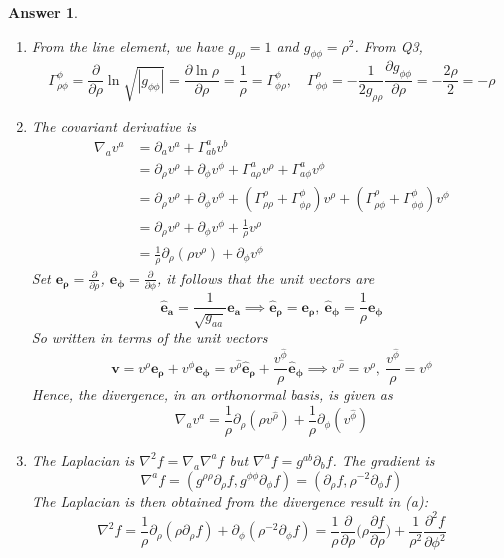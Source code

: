\documentclass[a4paper]{article}
\theoremstyle{new2}
\newtheorem{ans}{Answer}[section]
\theoremstyle{new}
\begin{document}
\begin{ans}\leavevmode
\begin{enumerate}[label=(\alph*)]
\item From the line element, we have $g_{\rho\rho}=1$ and $g_{\phi\phi}=\rho^2$. From Q3, 
$$\Gamma_{\rho\phi}^\phi=\frac{\partial}{\partial\rho}\ln\sqrt{|g_{\phi\phi}|}=\frac{\partial\ln\rho}{\partial\rho}=\frac{1}{\rho}=\Gamma_{\phi\rho}^\phi,\quad\Gamma_{\phi\phi}^\rho=-\frac{1}{2g_{\rho\rho}}\frac{\partial g_{\phi\phi}}{\partial\rho}=-\frac{2\rho}{2}=-\rho$$
\item The covariant derivative is
\begin{align}
    \nabla_av^a&=\partial_av^a+\Gamma_{ab}^av^b\nonumber\\&=\partial_\rho v^\rho+\partial_\phi v^\phi+\Gamma_{a\rho}^av^\rho+\Gamma_{a\phi}^a v^\phi\nonumber\\&=\partial_\rho v^\rho+\partial_\phi v^\phi+(\Gamma_{\rho\rho}^\rho+\Gamma_{\phi\rho}^\phi)v^\rho+(\Gamma_{\rho\phi}^\rho+\Gamma_{\phi\phi}^\phi) v^\phi\nonumber\\&=\partial_\rho v^\rho+\partial_\phi v^\phi+\frac{1}{\rho}v^\rho\nonumber\\&=\frac{1}{\rho}\partial_\rho(\rho v^\rho)+\partial_\phi v^\phi\nonumber
\end{align}
Set $\boldsymbol{e_\rho}=\frac{\partial}{\partial\rho}$, $\boldsymbol{e_\phi}=\frac{\partial}{\partial\phi}$, it follows that the unit vectors are
$$\boldsymbol{\hat{e}_a}=\frac{1}{\sqrt{g_{aa}}}\boldsymbol{e_a}\implies\boldsymbol{\hat{e}_\rho}=\boldsymbol{e_\rho},~\boldsymbol{\hat{e}_\phi}=\frac{1}{\rho}\boldsymbol{e_\phi}$$
So written in terms of the unit vectors
$$\mathbf{v}=v^\rho\boldsymbol{e_\rho}+v^\phi\boldsymbol{e_\phi}=v^{\hat{\rho}}\boldsymbol{\hat{e}_\rho}+\frac{v^{\hat{\phi}}}{\rho}\boldsymbol{\hat{e}_\phi}\implies v^{\hat{\rho}}=v^\rho,~\frac{v^{\hat{\phi}}}{\rho}=v^\phi$$
Hence, the divergence, in an orthonormal basis, is given as
$$\nabla_av^a=\frac{1}{\rho}\partial_\rho(\rho v^{\hat{\rho}})+\frac{1}{\rho}\partial_\phi(v^{\hat{\phi}})$$
\item The Laplacian is $\nabla^2f=\nabla_a\nabla^af$ but $\nabla^af=g^{ab}\partial_bf$. The gradient is
$$\nabla^af=(g^{\rho\rho}\partial_\rho f,g^{\phi\phi}\partial_\phi f)=(\partial_\rho f,\rho^{-2}\partial_\phi f)$$
The Laplacian is then obtained from the divergence result in (a):
$$\nabla^2f=\frac{1}{\rho}\partial_\rho(\rho\partial_\rho f)+\partial_\phi(\rho^{-2}\partial_\phi f)=\frac{1}{\rho}\frac{\partial}{\partial\rho}\bigg(\rho\frac{\partial f}{\partial\rho}\bigg)+\frac{1}{\rho^2}\frac{\partial^2f}{\partial\phi^2}$$
\end{enumerate}
\end{ans}
\end{document}
